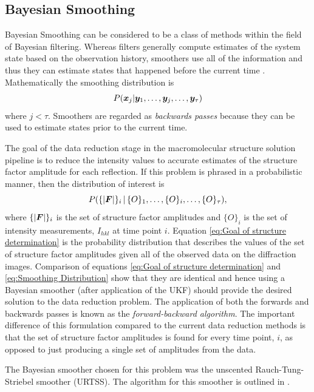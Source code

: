 \subsection{Bayesian Smoothing}
\label{sub:Bayesian Smoothing}
Bayesian Smoothing can be considered to be a class of methods within the field of Bayesian filtering.
Whereas filters generally compute estimates of the system state based on the observation history, smoothers use all of the information and thus they can estimate states that happened before the current time \cite{sarkka2013}.
Mathematically the smoothing distribution is
\begin{equation}
    P(\boldsymbol{x}_j | \boldsymbol{y}_1, \ldots, \boldsymbol{y}_j, \ldots, \boldsymbol{y}_{\tau})
    \label{eq:Smoothing Distribution}
\end{equation}
where $j < \tau$.
Smoothers are regarded as \textit{backwards passes} because they can be used to estimate states prior to the current time.

The goal of the data reduction stage in the macromolecular structure solution pipeline is to reduce the intensity values to accurate estimates of the structure factor amplitude for each reflection.
If this problem is phrased in a probabilistic manner, then the distribution of interest is
\begin{equation}
    P(\{|\boldsymbol{F}|\}_i \,|\, \{O\}_1, \ldots, \{O\}_i,\ldots, \{O\}_{\tau}),
    \label{eq:Goal of structure determination}
\end{equation}
where $\{|\boldsymbol{F}|\}_i$ is the set of structure factor amplitudes and $\{O\}_i$ is the set of intensity measurements, $I_{hkl}$ at time point $i$.
Equation \ref{eq:Goal of structure determination} is the probability distribution that describes the values of the set of structure factor amplitudes given all of the observed data on the diffraction images.
Comparison of equations \ref{eq:Goal of structure determination} and \ref{eq:Smoothing Distribution} show that they are identical and hence using a Bayesian smoother (after application of the UKF) should provide the desired solution to the data reduction problem.
The application of both the forwards and backwards passes is known as the \textit{forward-backward algorithm}.
The important difference of this formulation compared to the current data reduction methods is that the set of structure factor amplitudes is found for every time point, $i$, as opposed to just producing a single set of amplitudes from the data.

The Bayesian smoother chosen for this problem was the unscented Rauch-Tung-Striebel smoother (URTSS).
The algorithm for this smoother is outlined in \cite{sarkka2008unscented}.

